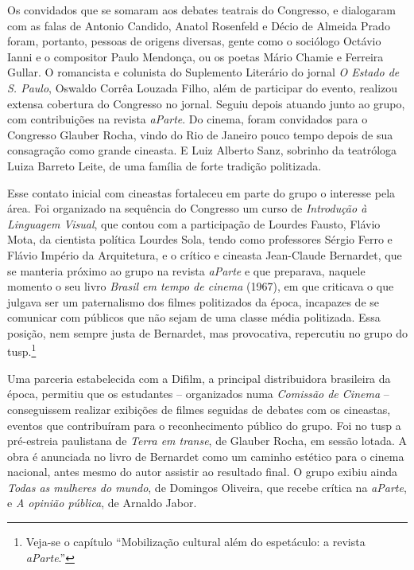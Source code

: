 Os convidados que se somaram aos debates teatrais do Congresso, e
dialogaram com as falas de Antonio Candido, Anatol Rosenfeld e Décio de
Almeida Prado foram, portanto, pessoas de origens diversas, gente como o
sociólogo Octávio Ianni e o compositor Paulo Mendonça, ou os poetas
Mário Chamie e Ferreira Gullar. O romancista e colunista do Suplemento
Literário do jornal {\it O Estado de S. Paulo}, Oswaldo Corrêa Louzada
Filho, além de participar do evento, realizou extensa cobertura do
Congresso no jornal. Seguiu depois atuando junto ao grupo, com
contribuições na revista {\it aParte}. Do cinema, foram convidados para
o Congresso Glauber Rocha, vindo do Rio de Janeiro pouco tempo depois de
sua consagração como grande cineasta. E Luiz Alberto Sanz, sobrinho da
teatróloga Luiza Barreto Leite, de uma família de forte tradição
politizada.

Esse contato inicial com cineastas fortaleceu em parte do grupo o
interesse pela área. Foi organizado na sequência do Congresso um curso
de {\it Introdução à Linguagem Visual}, que contou com a participação de
Lourdes Fausto, Flávio Mota, da cientista política Lourdes Sola, tendo
como professores Sérgio Ferro e Flávio Império da Arquitetura, e o
crítico e cineasta Jean-Claude Bernardet, que se manteria próximo ao
grupo na revista {\it aParte} e que preparava, naquele momento o seu
livro {\it Brasil em tempo de cinema} (1967), em que criticava o que
julgava ser um paternalismo dos filmes politizados da época, incapazes
de se comunicar com públicos que não sejam de uma classe média
politizada. Essa posição, nem sempre justa de Bernardet, mas
provocativa, repercutiu no grupo do {\sc tusp}.\footnote{Veja-se o capítulo
  “Mobilização cultural além do espetáculo: a revista {\it aParte}.”}

Uma parceria estabelecida com a Difilm, a principal distribuidora
brasileira da época, permitiu que os estudantes -- organizados numa
{\it Comissão de Cinema} -- conseguissem realizar exibições de filmes
seguidas de debates com os cineastas, eventos que contribuíram para o
reconhecimento público do grupo. Foi no {\sc tusp} a pré-estreia paulistana de
{\it Terra em transe}, de Glauber Rocha, em sessão lotada. A obra é
anunciada no livro de Bernardet como um caminho estético para o cinema
nacional, antes mesmo do autor assistir ao resultado final. O grupo
exibiu ainda {\it Todas as mulheres do mundo}, de Domingos Oliveira, que
recebe crítica na {\it aParte}, e {\it A opinião pública}, de Arnaldo
Jabor.


